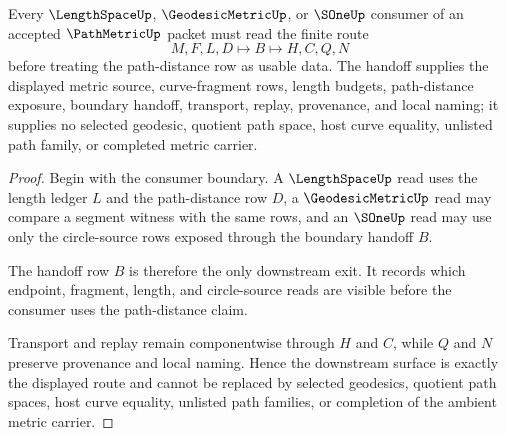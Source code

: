 \begin{theorem}
\label{thm:path-metric-length-space-handoff}
Every $\LengthSpaceUp$, $\GeodesicMetricUp$, or $\SOneUp$ consumer of an accepted $\PathMetricUp$ packet must read the finite route
$$
M,F,L,D \longmapsto B \longmapsto H,C,Q,N
$$
before treating the path-distance row as usable data. The handoff supplies the displayed metric source, curve-fragment rows, length budgets, path-distance exposure, boundary handoff, transport, replay, provenance, and local naming; it supplies no selected geodesic, quotient path space, host curve equality, unlisted path family, or completed metric carrier.
\end{theorem}
\begin{proof}
Begin with the consumer boundary. A $\LengthSpaceUp$ read uses the length ledger $L$ and the path-distance row $D$, a $\GeodesicMetricUp$ read may compare a segment witness with the same rows, and an $\SOneUp$ read may use only the circle-source rows exposed through the boundary handoff $B$.

The handoff row $B$ is therefore the only downstream exit. It records which endpoint, fragment, length, and circle-source reads are visible before the consumer uses the path-distance claim.

Transport and replay remain componentwise through $H$ and $C$, while $Q$ and $N$ preserve provenance and local naming. Hence the downstream surface is exactly the displayed route and cannot be replaced by selected geodesics, quotient path spaces, host curve equality, unlisted path families, or completion of the ambient metric carrier.
\end{proof}


\begin{closurestatus}{\PathMetricUp}
  \theoryclosure{\seedClosure}
  \formalstatus{\unformalizedV}
\end{closurestatus}
